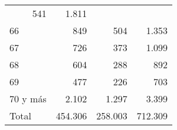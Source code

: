 \begin{tabular}{llll}
  \multicolumn{1}{r}{541} &
  \multicolumn{1}{r}{1.811} \\
\multicolumn{1}{l}{\hspace{1em}66} &
  \multicolumn{1}{|r}{849} &
  \multicolumn{1}{r}{504} &
  \multicolumn{1}{r}{1.353} \\
\multicolumn{1}{l}{\hspace{1em}67} &
  \multicolumn{1}{|r}{726} &
  \multicolumn{1}{r}{373} &
  \multicolumn{1}{r}{1.099} \\
\multicolumn{1}{l}{\hspace{1em}68} &
  \multicolumn{1}{|r}{604} &
  \multicolumn{1}{r}{288} &
  \multicolumn{1}{r}{892} \\
\multicolumn{1}{l}{\hspace{1em}69} &
  \multicolumn{1}{|r}{477} &
  \multicolumn{1}{r}{226} &
  \multicolumn{1}{r}{703} \\
\multicolumn{1}{l}{\hspace{1em}70 y más} &
  \multicolumn{1}{|r}{2.102} &
  \multicolumn{1}{r}{1.297} &
  \multicolumn{1}{r}{3.399} \\
\multicolumn{1}{l}{\hspace{1em}Total} &
  \multicolumn{1}{|r}{454.306} &
  \multicolumn{1}{r}{258.003} &
  \multicolumn{1}{r}{712.309} \\
\cline{1-4}
\end{tabular}
